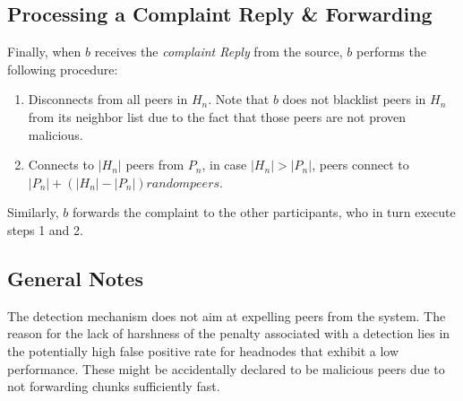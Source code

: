 

\subsection{Processing a Complaint Reply \& Forwarding}

Finally, when $b$ receives the \textit{complaint Reply} from the source, $b$ performs the following procedure:

\begin{enumerate}
 \item Disconnects from all peers in $H_n$. Note that $b$ does not blacklist peers in $H_n$ from its neighbor list due to the fact that those peers are not proven malicious.
 \item Connects to $|H_n|$ peers from $P_n$, in case $|H_n|>|P_n|$, peers connect to $|P_n|+(|H_n|-|P_n|)random peers$.
\end{enumerate}
Similarly, $b$ forwards the complaint to the other participants, who in turn execute steps 1 and 2.

\subsection{General Notes}
The detection mechanism does not aim at expelling peers from the system.
The reason for the lack of harshness of the penalty associated with a detection lies in the potentially high false positive rate for headnodes that exhibit a low performance. 
These might be accidentally declared to be malicious peers due to not forwarding chunks sufficiently fast. 

